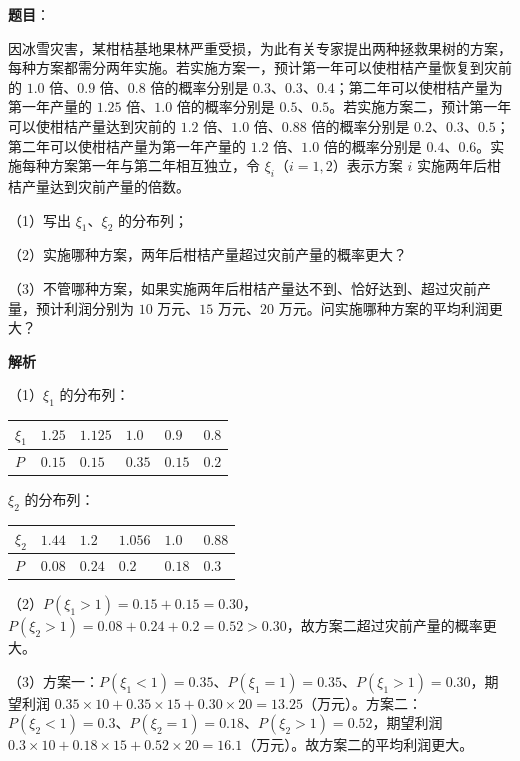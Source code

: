 \begin{answer}

\textbf{题目}：

因冰雪灾害，某柑桔基地果林严重受损，为此有关专家提出两种拯救果树的方案，每种方案都需分两年实施。若实施方案一，预计第一年可以使柑桔产量恢复到灾前的 $1.0$ 倍、$0.9$ 倍、$0.8$ 倍的概率分别是 $0.3$、$0.3$、$0.4$；第二年可以使柑桔产量为第一年产量的 $1.25$ 倍、$1.0$ 倍的概率分别是 $0.5$、$0.5$。若实施方案二，预计第一年可以使柑桔产量达到灾前的 $1.2$ 倍、$1.0$ 倍、$0.88$ 倍的概率分别是 $0.2$、$0.3$、$0.5$；第二年可以使柑桔产量为第一年产量的 $1.2$ 倍、$1.0$ 倍的概率分别是 $0.4$、$0.6$。实施每种方案第一年与第二年相互独立，令 $\xi_i$（$i=1,2$）表示方案 $i$ 实施两年后柑桔产量达到灾前产量的倍数。

（1）写出 $\xi_1$、$\xi_2$ 的分布列；

（2）实施哪种方案，两年后柑桔产量超过灾前产量的概率更大？

（3）不管哪种方案，如果实施两年后柑桔产量达不到、恰好达到、超过灾前产量，预计利润分别为 $10$ 万元、$15$ 万元、$20$ 万元。问实施哪种方案的平均利润更大？

\textbf{解析}

（1）$\xi_1$ 的分布列：

\begin{center}
\begin{tabular}{llllll}
\toprule
$\xi_1$ & $1.25$ & $1.125$ & $1.0$ & $0.9$ & $0.8$ \\
\midrule
$P$ & $0.15$ & $0.15$ & $0.35$ & $0.15$ & $0.2$ \\
\bottomrule
\end{tabular}
\end{center}

$\xi_2$ 的分布列：

\begin{center}
\begin{tabular}{llllll}
\toprule
$\xi_2$ & $1.44$ & $1.2$ & $1.056$ & $1.0$ & $0.88$ \\
\midrule
$P$ & $0.08$ & $0.24$ & $0.2$ & $0.18$ & $0.3$ \\
\bottomrule
\end{tabular}
\end{center}

（2）$P(\xi_1>1)=0.15+0.15=0.30$，$P(\xi_2>1)=0.08+0.24+0.2=0.52>0.30$，故方案二超过灾前产量的概率更大。

（3）方案一：$P(\xi_1<1)=0.35$、$P(\xi_1=1)=0.35$、$P(\xi_1>1)=0.30$，期望利润 $0.35\times10+0.35\times15+0.30\times20=13.25$（万元）。方案二：$P(\xi_2<1)=0.3$、$P(\xi_2=1)=0.18$、$P(\xi_2>1)=0.52$，期望利润 $0.3\times10+0.18\times15+0.52\times20=16.1$（万元）。故方案二的平均利润更大。


\end{answer}
